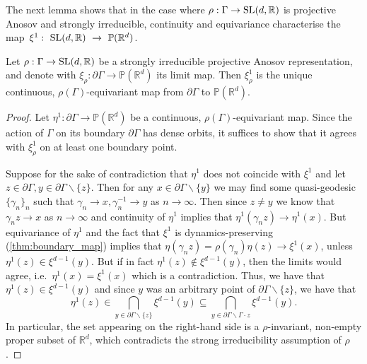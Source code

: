 \documentclass{report}
\begin{document}
The next lemma shows that in the case where $\rho: \Gamma \to \operatorname{{\mathrm{SL}}}(d, \mathbb R)$ is projective Anosov and strongly irreducible, continuity and equivariance characterise the map~$\xi^1:~\operatorname{{\mathrm{SL}}}(d, \mathbb R)~\to~\mathbb P(\mathbb R^d)$.
\begin{lemma}\label{lem:equivariance_uniqueness}
    Let $\rho: \Gamma \to \operatorname{{\mathrm{SL}}}(d, \mathbb R) $ be a strongly irreducible projective Anosov representation, and denote with $\xi_\rho: \partial \Gamma \to \mathbb P(\mathbb R^d)$ its limit map.
    Then $\xi^1_\rho$ is the unique continuous, $\rho(\Gamma)$-equivariant map from $\partial \Gamma$ to $\mathbb P(\mathbb R^d)$.
\end{lemma}
\begin{proof}
    Let $\eta^1: \partial \Gamma \to \mathbb P(\mathbb R^d)$ be a continuous, $\rho(\Gamma)$-equivariant map.
    Since the action of $\Gamma$ on its boundary $\partial \Gamma$ has dense orbits, it suffices to show that it agrees with $\xi^1_\rho$ on at least one boundary point.

    Suppose for the sake of contradiction that $\eta^1$ does not coincide with $ \xi^1$ and let $z \in \partial \Gamma, y \in \partial \Gamma \backslash \{z\}$.
    Then for any $x \in \partial \Gamma \backslash \{y \}$ we may find some quasi-geodesic $\{\gamma_n\}_n$ such that $\gamma_n \to x, \gamma_n^{-1} \to y$ as $n \to \infty$.
    Then since $z \neq y$ we know that $\gamma_n z \to x$ as $n \to \infty$ and continuity of $\eta^1$ implies that $\eta^1(\gamma_n z) \to \eta^1(x)$.
    But equivariance of $\eta^1$ and the fact that $\xi^1$ is dynamics-preserving (\cref{thm:boundary_map}) implies that $\eta(\gamma_n z) = \rho(\gamma_n) \eta(z) \to \xi^1(x)$,
    unless $\eta^1(z) \in \xi^{d-1}(y)$.
    But if in fact $\eta^1(z) \not \in \xi^{d-1}(y)$, then the limits would agree, i.e.\ $\eta^1(x) = \xi^1(x)$ which is a contradiction.
    Thus, we have that $\eta^1(z) \in \xi^{d-1}(y)$ and since $y$ was an arbitrary point of $\partial \Gamma \backslash \{z\}$, we have that
    \[
    \eta^1(z) \in \bigcap_{y \in \partial \Gamma \backslash \{z\}} \xi^{d-1}(y) \subseteq 
    \bigcap_{y \in \partial \Gamma \backslash \Gamma \cdot z} \xi^{d-1}(y).
    \] 
    In particular, the set appearing on the right-hand side is a $\rho$-invariant, non-empty proper subset of $\mathbb R^d$, which contradicts the strong irreducibility assumption of $\rho$.
\end{proof}
\end{document}
